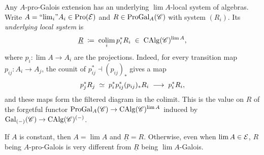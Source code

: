 \documentclass[english,svgnames,table]{article}
\begin{document}
    \begin{remark}
    \label{rmk:galois-vs-progalois-clean}
        Any $A$-pro-Galois extension has an underlying $\lim A$-local system of algebras.
        Write $A = \text{``$\lim_{i}$''} A_i \in \operatorname{Pro}(\mathcal{E})$ and $R \in \mathrm{ProGal}_A(\mathscr{C})$ with system $(R_i)$.
        Its \emph{underlying local system} is
        \begin{equation*}
            \underline{R} \;\coloneq\; \operatorname*{colim}_i p_i^* R_i \;\in\; \operatorname{CAlg}(\mathscr{C})^{\lim A},
        \end{equation*}
        where $p_i \colon \lim A \to A_i$ are the projections.
        Indeed, for every transition map $p_{ij} \colon A_i \to A_j$, the counit of $p_{ij}^* \dashv (p_{ij})_*$ gives a map
        \begin{equation*}
            p_j^* R_j \;\simeq\; p_i^*p_{ij}^*(p_{ij})_*R_i \;\longrightarrow\; p_i^*R_i,
        \end{equation*}
        and these maps form the filtered diagram in the colimit.
        This is the value
        on $R$ of the forgetful functor
        $\mathrm{ProGal}_A(\mathscr{C}) \to \operatorname{CAlg}(\mathscr{C})^{\lim A}$ induced by $\mathrm{Gal}_{(-)}(\mathscr{C}) \to \operatorname{CAlg}(\mathscr{C})^{(-)}$.

        If $A$ is constant, then $A = \lim A$ and $\underline{R} = R$. Otherwise, even when $\lim A \in \mathcal{E}$, $R$ being $A$-pro-Galois is very different from $\underline{R}$ being $\lim A$-Galois.
    \end{remark}




\end{document}
